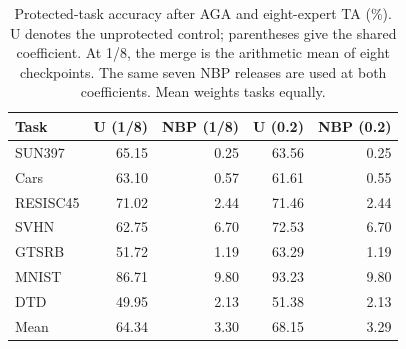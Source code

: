\begin{table}[!htbp]
\centering
\small
\setlength{\tabcolsep}{3pt}
\caption{Protected-task accuracy after AGA and eight-expert TA (\%). U denotes the unprotected control; parentheses give the shared coefficient. At 1/8, the merge is the arithmetic mean of eight checkpoints. The same seven NBP releases are used at both coefficients. Mean weights tasks equally.}
\label{tab:equal-weight}
\begin{tabular}{lrrrr}
\toprule
Task & U (1/8) & NBP (1/8) & U (0.2) & NBP (0.2) \\
\midrule
SUN397 & 65.15 & 0.25 & 63.56 & 0.25 \\
Cars & 63.10 & 0.57 & 61.61 & 0.55 \\
RESISC45 & 71.02 & 2.44 & 71.46 & 2.44 \\
SVHN & 62.75 & 6.70 & 72.53 & 6.70 \\
GTSRB & 51.72 & 1.19 & 63.29 & 1.19 \\
MNIST & 86.71 & 9.80 & 93.23 & 9.80 \\
DTD & 49.95 & 2.13 & 51.38 & 2.13 \\
\midrule
Mean & 64.34 & 3.30 & 68.15 & 3.29 \\
\bottomrule
\end{tabular}
\end{table}
